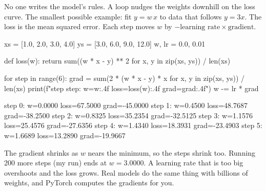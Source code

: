 \begin{boss}
No one writes the model's rules. A loop nudges the weights downhill on the loss curve. The smallest
possible example: fit $y = w\,x$ to data that follows $y=3x$. The loss is the mean squared error.
Each step moves $w$ by $-\text{learning rate}\times\text{gradient}$.

\begin{pycode}
xs = [1.0, 2.0, 3.0, 4.0]
ys = [3.0, 6.0, 9.0, 12.0]
w, lr = 0.0, 0.01

def loss(w):
    return sum((w * x - y) ** 2 for x, y in zip(xs, ys)) / len(xs)

for step in range(6):
    grad = sum(2 * (w * x - y) * x for x, y in zip(xs, ys)) / len(xs)
    print(f"step {step}: w={w:.4f} loss={loss(w):.4f} grad={grad:.4f}")
    w -= lr * grad
\end{pycode}
\begin{rawcode}
step 0: w=0.0000 loss=67.5000 grad=-45.0000
step 1: w=0.4500 loss=48.7687 grad=-38.2500
step 2: w=0.8325 loss=35.2354 grad=-32.5125
step 3: w=1.1576 loss=25.4576 grad=-27.6356
step 4: w=1.4340 loss=18.3931 grad=-23.4903
step 5: w=1.6689 loss=13.2890 grad=-19.9667
\end{rawcode}

\begin{center}
\end{center}

The gradient shrinks as $w$ nears the minimum, so the steps shrink too. Running 200 more steps (my
run) ends at $w=3.0000$. A learning rate that is too big overshoots and the loss grows. Real models
do the same thing with billions of weights, and PyTorch computes the gradients for you.
\end{boss}

